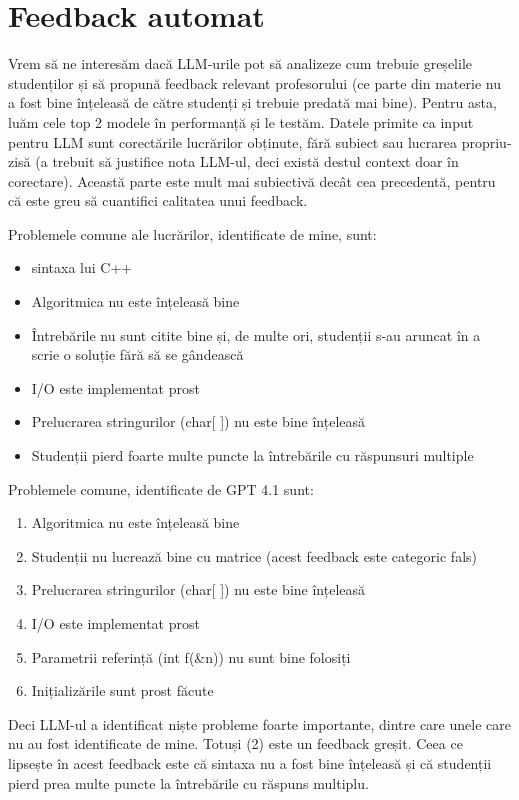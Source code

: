 \documentclass[12pt, a4paper]{report}
\begin{document}
\section{Feedback automat}
\begingroup
\fontsize{13pt}{13pt}\selectfont
Vrem să ne interesăm dacă LLM-urile pot să analizeze cum trebuie greșelile studenților
și să propună feedback relevant profesorului (ce parte din materie nu a fost bine înțeleasă de către studenți și trebuie predată mai bine).
Pentru asta, luăm cele top 2 modele în performanță și le testăm. Datele primite ca input pentru LLM sunt corectările lucrărilor obținute, fără subiect sau lucrarea propriu-zisă (a trebuit să justifice nota LLM-ul, deci există destul context doar în corectare).
Această parte este mult mai subiectivă decât cea precedentă, pentru că este greu să cuantifici calitatea unui feedback.

Problemele comune ale lucrărilor, identificate de mine, sunt:
\begin{itemize}
\item sintaxa lui C++
\item Algoritmica nu este înțeleasă bine
\item Întrebările nu sunt citite bine și, de multe ori, studenții s-au aruncat în a scrie o soluție fără să se gândească
\item I/O este implementat prost
\item Prelucrarea stringurilor (char[ ]) nu este bine înțeleasă
\item Studenții pierd foarte multe puncte la întrebările cu răspunsuri multiple
\end{itemize}

Problemele comune, identificate de GPT 4.1 sunt:
\begin{enumerate}
\item Algoritmica nu este înțeleasă bine
\item Studenții nu lucrează bine cu matrice (acest feedback este categoric fals)
\item Prelucrarea stringurilor (char[ ]) nu este bine înțeleasă
\item I/O este implementat prost
\item Parametrii referință (int f(\&n)) nu sunt bine folosiți
\item Inițializările sunt prost făcute
\end{enumerate}

Deci LLM-ul a identificat niște probleme foarte importante, dintre care unele care nu au fost identificate de mine. Totuși (2) este un feedback greșit.
Ceea ce lipsește în acest feedback este că sintaxa nu a fost bine înțeleasă și că studenții pierd prea multe puncte la întrebările cu răspuns multiplu.
\end{document}
